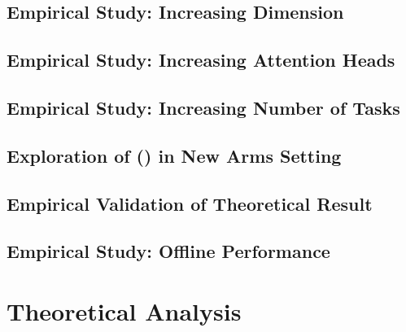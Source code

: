 \subsection{Empirical Study: Increasing Dimension}
\label{sec:dimension}



\subsection{Empirical Study: Increasing Attention Heads}
\label{sec:heads}




\subsection{Empirical Study: Increasing Number of Tasks}
\label{sec:envs}



% 


\subsection{Exploration of \pred (\gt) in New Arms Setting}
\label{sec:new-arms-app}



% 

\subsection{Empirical Validation of Theoretical Result}
\label{sec:validation}


\subsection{Empirical Study: Offline Performance}
\label{sec:offline}




\section{Theoretical Analysis}
\label{sec:theory-app}




